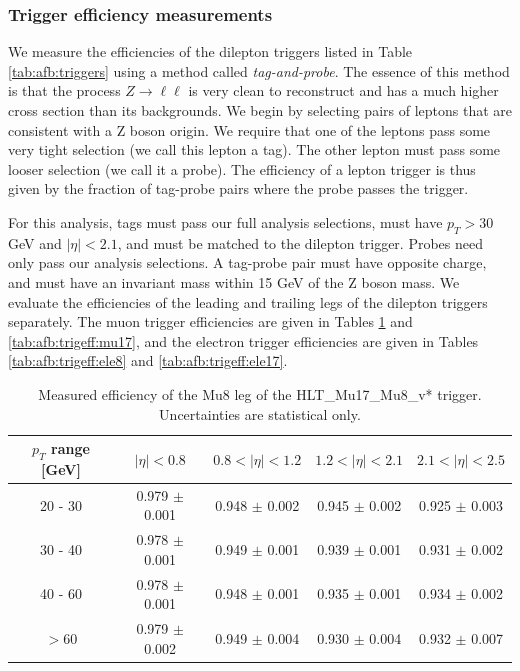 \subsubsection{Trigger efficiency measurements} %
\label{sssec:afb:evtweights:trigeff}
We measure the efficiencies of the dilepton triggers listed in Table
\ref{tab:afb:triggers} using a method called \emph{tag-and-probe}. The
essence of this method is that the process $Z \rightarrow \ell\ell$
is very clean to reconstruct and has a much higher cross section than its
backgrounds. We begin by selecting pairs of leptons that are consistent with
a Z boson origin. We require that one of the leptons pass some very tight
selection (we call this lepton a tag). The other lepton must pass some
looser selection (we call it a probe). The efficiency of a lepton
trigger is thus given by the fraction of tag-probe pairs where the
probe passes the trigger.

For this analysis, tags must pass our full analysis selections, must
have $p_T > 30$ GeV and $|\eta| < 2.1$, and must be matched to the
dilepton trigger. Probes need only pass our analysis
selections. A tag-probe pair must have opposite charge, and must have an invariant mass within 15
GeV of the Z boson mass. We evaluate the efficiencies of the leading
and trailing legs of the dilepton triggers separately. The muon trigger
efficiencies are given in Tables \ref{tab:afb:trigeff:mu8} and
\ref{tab:afb:trigeff:mu17}, and the electron trigger efficiencies are
given in Tables \ref{tab:afb:trigeff:ele8} and \ref{tab:afb:trigeff:ele17}.

\begin{table}[htbp]
\begin{center}
\footnotesize
\caption[Measured efficiency of the Mu8 leg of the dimuon
trigger. Uncertainties are statistical only.]
{Measured efficiency of the Mu8 leg of the
HLT\_Mu17\_Mu8\_v* trigger. Uncertainties are statistical only.}
\label{tab:afb:trigeff:mu8}
\begin{tabular}{c|c|c|c|c}
\hline
\hline
  $p_T$ range [GeV] & $|\eta|<0.8$ & $0.8<|\eta|<1.2$ & $1.2<|\eta|<2.1$  & $2.1<|\eta|<2.5$\\
\hline
  20 -  30  & 0.979 $\pm$ 0.001 & 0.948 $\pm$ 0.002 & 0.945 $\pm$ 0.002 & 0.925 $\pm$ 0.003\\
  30 -  40  & 0.978 $\pm$ 0.001 & 0.949 $\pm$ 0.001 & 0.939 $\pm$ 0.001 & 0.931 $\pm$ 0.002\\
  40 -  60  & 0.978 $\pm$ 0.001 & 0.948 $\pm$ 0.001 & 0.935 $\pm$ 0.001 & 0.934 $\pm$ 0.002\\
  $>$60     & 0.979 $\pm$ 0.002 & 0.949 $\pm$ 0.004 & 0.930 $\pm$ 0.004 & 0.932 $\pm$ 0.007\\
\hline
\hline
\end{tabular}
\end{center}
\end{table}

